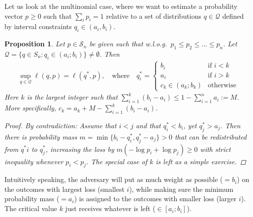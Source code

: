 \documentclass{article}
\newtheorem{proposition}{Proposition}
\begin{document}
Let us look at the multinomial case, where we want to estimate a probability vector $p \ge 0$ such that $\sum_i p_i=1$ relative to a set of distributions $q \in \mathcal Q$ defined by interval constraints $q_i \in (a_i,b_i)$.
\begin{proposition}
\label{prop:opt-q}
Let $p \in \mathcal S_n$ be given such that w.l.o.g.~$p_1 \leq p_2 \leq ... \leq p_n$. Let $\mathcal Q = \{ q \in S_n: q_i \in (a_i;b_i) \} \neq \emptyset$. Then 
\begin{align}
\sup_{q \in \mathcal Q}  \ell(q,p) = \ell(q^*,p), \quad  \text{where} \quad 
q^*_i = 
\begin{cases} 
b_i & \text{if $i < k$} \\
a_i & \text{if $i > k$} \\
c_k \in (a_k;b_k) & \text{otherwise} 
\end{cases}
\end{align}
Here  $k$ is the largest integer such that $\sum_{i=1}^{k} (b_i-a_i) \le 1 - \sum_{i=1}^n a_i := M$. More specifically, $c_k = a_k + M - \sum_{i=1}^{k} (b_i-a_i)$. 
\begin{proof} By contradiction: Assume that $i<j$ and that $q^*_i < b_i$, yet $q^*_{j} > a_j$. Then there is probability mass $m = \min\{ b_i-q^*_i, q^*_{j} - a_{j}\} >0$ that can be redistributed from $q^*i$ to $q^*_j$, increasing the loss by $m \left( - \log p_i + \log p_{j} \right)  \ge 0$ with strict inequality whenever $p_i < p_{j}$. The special case of $k$ is left as a simple exercise.
\end{proof}
\end{proposition}

Intuitively speaking, the adversary will put as much weight as possible ($=b_i$) on the outcomes with largest loss (smallest $i$), while making sure the minimum probability mass ($=a_i$) is assigned to the outcomes with smaller loss (larger $i$). The critical value $k$ just receives whatever is left ($\in [a_i; b_i]$). 
\end{document}
